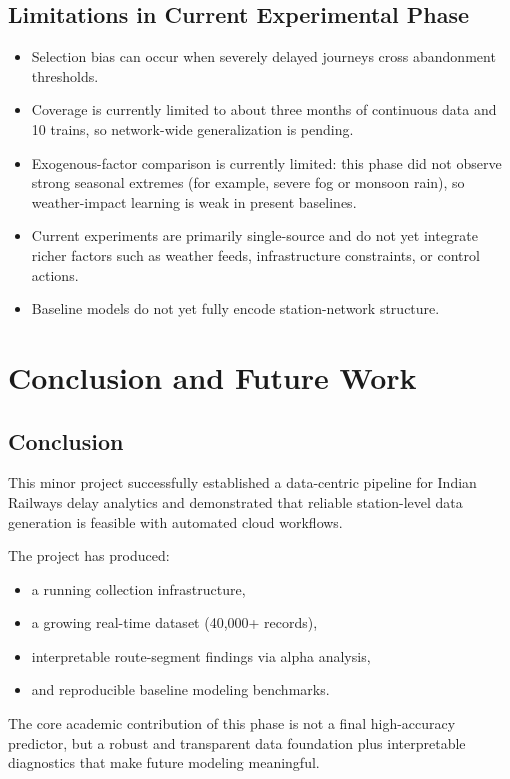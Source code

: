 \documentclass[12pt,a4paper]{report}
\begin{document}
\section{Limitations in Current Experimental Phase}
\begin{itemize}
    \item Selection bias can occur when severely delayed journeys cross abandonment thresholds.
    \item Coverage is currently limited to about three months of continuous data and 10 trains, so network-wide generalization is pending.
    \item Exogenous-factor comparison is currently limited: this phase did not observe strong seasonal extremes (for example, severe fog or monsoon rain), so weather-impact learning is weak in present baselines.
    \item Current experiments are primarily single-source and do not yet integrate richer factors such as weather feeds, infrastructure constraints, or control actions.
    \item Baseline models do not yet fully encode station-network structure.
\end{itemize}

\chapter{Conclusion and Future Work}

\section{Conclusion}
This minor project successfully established a data-centric pipeline for Indian Railways delay analytics and demonstrated that reliable station-level data generation is feasible with automated cloud workflows.

The project has produced:
\begin{itemize}
    \item a running collection infrastructure,
    \item a growing real-time dataset (40,000+ records),
    \item interpretable route-segment findings via alpha analysis,
    \item and reproducible baseline modeling benchmarks.
\end{itemize}

The core academic contribution of this phase is not a final high-accuracy predictor, but a robust and transparent data foundation plus interpretable diagnostics that make future modeling meaningful.
\end{document}
